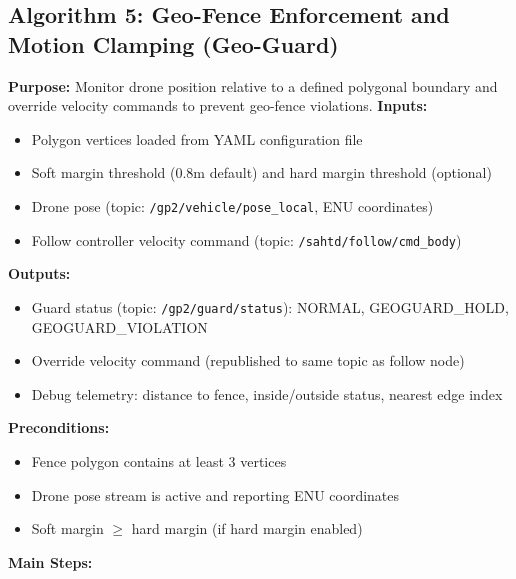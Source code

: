 \documentclass[12pt,a4paper]{report}
\begin{document}
\subsection{Algorithm 5: Geo-Fence Enforcement and Motion Clamping (Geo-Guard)}
\textbf{Purpose:} Monitor drone position relative to a defined polygonal boundary and override velocity commands to prevent geo-fence violations.
\textbf{Inputs:}
\begin{itemize}
    \item Polygon vertices loaded from YAML configuration file
    \item Soft margin threshold (0.8m default) and hard margin threshold (optional)
    \item Drone pose (topic: \texttt{/gp2/vehicle/pose\_local}, \ac{ENU} coordinates)
    \item Follow controller velocity command (topic: \texttt{/sahtd/follow/cmd\_body})
\end{itemize}
\textbf{Outputs:}
\begin{itemize}
    \item Guard status (topic: \texttt{/gp2/guard/status}): NORMAL, GEOGUARD\_HOLD, GEOGUARD\_VIOLATION
    \item Override velocity command (republished to same topic as follow node)
    \item Debug telemetry: distance to fence, inside/outside status, nearest edge index
\end{itemize}
\textbf{Preconditions:}
\begin{itemize}
    \item Fence polygon contains at least 3 vertices
    \item Drone pose stream is active and reporting \ac{ENU} coordinates
    \item Soft margin $\geq$ hard margin (if hard margin enabled)
\end{itemize}
\textbf{Main Steps:}
\end{document}
